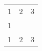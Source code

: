 \documentclass{article}
\begin{document}
\begin{tabular}{ c c c }
1 & 2 & 3 \\
1 & & \\
1 & 2 & 3 \\
\end{tabular}
\end{document}
